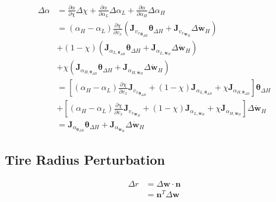 \begin{equation}
    \begin{split}
        \Delta \alpha &= \frac{\partial\alpha}{\partial\chi}\Delta\chi + \frac{\partial\alpha}{\partial\alpha_L}\Delta\alpha_L + \frac{\partial\alpha}{\partial\alpha_H}\Delta\alpha_H \\
        &= \left(\alpha_H - \alpha_L\right)\frac{\partial\chi}{\partial v_x}\left(\mathbf{J}_{{v_x}_{\boldsymbol{\theta}_{\Delta H}}} \boldsymbol{\theta}_{\Delta H} + \mathbf{J}_{{v_x}_{\dot{\mathbf{w}}_H}} \Delta {\dot{\mathbf{w}}}_H\right)\\
        &+ \left(1-\chi\right)\left(\mathbf{J}_{\alpha_{L, \boldsymbol{\theta}_{\Delta H}}}\boldsymbol{\theta}_{\Delta H} + \mathbf{J}_{\alpha_{L, \dot{\mathbf{w}}_H}}\Delta {\dot{\mathbf{w}}}_H\right)\\
        &+ \chi\left(\mathbf{J}_{\alpha_{H, \boldsymbol{\theta}_{\Delta H}}}\boldsymbol{\theta}_{\Delta H} + \mathbf{J}_{\alpha_{H, \dot{\mathbf{w}}_H}}\Delta {\dot{\mathbf{w}}}_H\right)\\
        &= \left[\left(\alpha_H - \alpha_L\right)\frac{\partial\chi}{\partial v_x}\mathbf{J}_{{v_x}_{\boldsymbol{\theta}_{\Delta H}}} + \left(1-\chi\right)\mathbf{J}_{\alpha_{L, \boldsymbol{\theta}_{\Delta H}}} + \chi \mathbf{J}_{\alpha_{H, \boldsymbol{\theta}_{\Delta H}}}\right] \boldsymbol{\theta}_{\Delta H}\\
        &+ \left[\left(\alpha_H - \alpha_L\right)\frac{\partial\chi}{\partial v_x}\mathbf{J}_{{v_x}_{\dot{\mathbf{w}}_H}} + \left(1-\chi\right)\mathbf{J}_{\alpha_{L, \dot{\mathbf{w}}_H}} + \chi \mathbf{J}_{\alpha_{H, \dot{\mathbf{w}}_H}}\right] \Delta {\dot{\mathbf{w}}}_H\\
        &= \mathbf{J}_{\alpha_{\boldsymbol{\theta}_{\Delta H}}}\boldsymbol{\theta}_{\Delta H} + \mathbf{J}_{\alpha_{\dot{\mathbf{w}}_H}}\Delta {\dot{\mathbf{w}}}_H
    \end{split}
\end{equation}

\subsection{Tire Radius Perturbation}
\begin{equation}
    \begin{split}
        \Delta r &= \Delta \mathbf{w} \cdot \mathbf{n}\\
        &= \mathbf{n}^T \Delta \mathbf{w}
    \end{split}
\end{equation}


